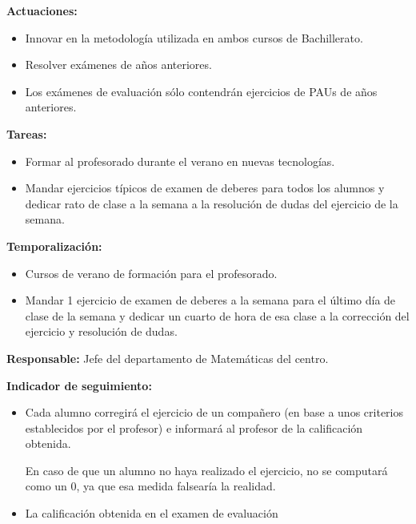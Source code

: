 \textbf{Actuaciones:}
\vspace{-0.
3cm}
\begin{itemize}
	\item Innovar en la metodología utilizada en ambos cursos de Bachillerato.

	\item Resolver exámenes de años anteriores.

	\item Los exámenes de evaluación sólo contendrán ejercicios de PAUs de años anteriores.

\end{itemize}

\textbf{Tareas:}
\vspace{-0.
3cm}
\begin{itemize}
	\item Formar al profesorado durante el verano en nuevas tecnologías.

	\item Mandar ejercicios típicos de examen de deberes para todos los alumnos y dedicar rato de clase a la semana a la resolución de dudas del ejercicio de la semana.

\end{itemize}


\textbf{Temporalización:}
\vspace{-0.
3cm}
\begin{itemize}
	\item Cursos de verano de formación para el profesorado.

	\item Mandar 1 ejercicio de examen de deberes a la semana para el último día de clase de la semana y dedicar un cuarto de hora de esa clase a la corrección del ejercicio y resolución de dudas.

\end{itemize}

\textbf{Responsable:}
Jefe del departamento de Matemáticas del centro.


\textbf{Indicador de seguimiento:}
\vspace{-0.
3cm}
\begin{itemize}
	\item Cada alumno corregirá el ejercicio de un compañero (en base a unos criterios establecidos por el profesor) e informará al profesor de la calificación obtenida.

	\subitem En caso de que un alumno no haya realizado el ejercicio, no se computará como un 0, ya que esa medida falsearía la realidad.

	\item La calificación obtenida en el examen de evaluación 
\end{itemize}

